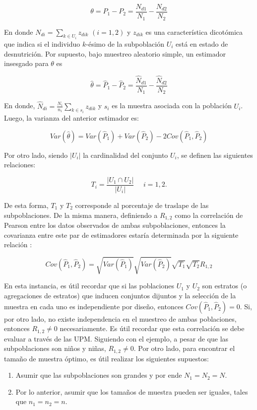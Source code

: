 \documentclass[
  12pt,
]{book}
\providecommand{\tightlist}{%
  \setlength{\itemsep}{0pt}\setlength{\parskip}{0pt}}
\begin{document}
\[
\theta=P_1-P_2=\frac{N_{d1}}{N_1}-\frac{N_{d2}}{N_2}
\]

En donde \(N_{di}=\sum_{k\in U_i}z_{dik}\) \((i=1,2)\) y \(z_{dik}\) es una característica dicotómica que indica si el individuo \(k\)-ésimo de la subpoblación \(U_i\) está en estado de desnutrición. Por supuesto, bajo muestreo aleatorio simple, un estimador insesgado para \(\theta\) es

\[
\hat{\theta}=\hat{P}_1-\hat{P}_2=\frac{\hat{N}_{d1}}{N_1}-\frac{\hat{N}_{d2}}{N_2}
\]

En donde, \(\hat{N}_{di}=\frac{N_i}{n_i}\sum_{k\in s_i}z_{dik}\) y \(s_i\) es la muestra asociada con la población \(U_i\). Luego, la varianza del anterior estimador es:

\[
Var(\hat{\theta})=Var\left(\hat{P}_1\right)+Var\left(\hat{P}_2\right)-2Cov\left(\hat{P}_1, \hat{P}_2\right)
\]

Por otro lado, siendo \(|U_i|\) la cardinalidad del conjunto \(U_i\), se definen las siguientes relaciones:

\[
T_i = \frac{|U_1 \cap U_2|}{|U_i|} \ \ \ \ \ \ i =1, 2. 
\]

De esta forma, \(T_1\) y \(T_2\) corresponde al porcentaje de traslape de las subpoblaciones. De la misma manera, definiendo a \(R_{1,2}\) como la correlación de Pearson entre los datos observados de ambas subpoblaciones, entonces la covarianza entre este par de estimadores estaría determinada por la siguiente relación \citep{Kish_2004}:

\[
Cov(\hat{P}_1, \hat{P}_2) = \sqrt{Var(\hat{P}_1)}\sqrt{Var(\hat{P}_2)}\sqrt{T_1}\sqrt{T_2}R_{1,2}
\]

En esta instancia, es útil recordar que si las poblaciones \(U_1\) y \(U_2\) son estratos (o agregaciones de estratos) que inducen conjuntos dijuntos y la selección de la muestra en cada uno es independiente por diseño, entonces \(Cov(\hat{P}_1, \hat{P}_2) = 0\). Si, por otro lado, no existe independencia en el muestreo de ambas poblaciones, entonces \(R_{1,2} \neq 0\) necesariamente. Es útil recordar que esta correlación se debe evaluar a través de las UPM. Siguiendo con el ejemplo, a pesar de que las subpoblaciones son niños y niñas, \(R_{1,2} \neq 0\). Por otro lado, para encontrar el tamaño de muestra óptimo, es útil realizar los siguientes supuestos:

\begin{enumerate}
\def\labelenumi{\arabic{enumi}.}
\tightlist
\item
  Asumir que las subpoblaciones son grandes y por ende \(N_1=N_2=N\).
\item
  Por lo anterior, asumir que los tamaños de muestra pueden ser iguales, tales que \(n_1=n_2=n\).
\end{enumerate}
\end{document}

